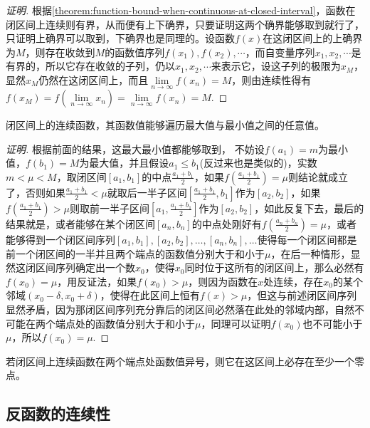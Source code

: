 \begin{proof}[证明]
  根据\autoref{theorem:function-bound-when-continuous-at-closed-interval}，函数在闭区间上连续则有界，从而便有上下确界，只要证明这两个确界能够取到就行了，只证明上确界可以取到，下确界也是同理的。设函数$f(x)$在这闭区间上的上确界为$M$，则存在收敛到$M$的函数值序列$f(x_1),f(x_2),\cdots$，而自变量序列$x_1,x_2,\cdots$是有界的，所以它存在收敛的子列，仍以$x_1,x_2,\cdots$来表示它，设这子列的极限为$x_M$，显然$x_M$仍然在这闭区间上，而且$\lim\limits_{n \to \infty}f(x_n)=M$，则由连续性得有$f(x_M)=f(\lim\limits_{n \to \infty} x_n) = \lim\limits_{n \to \infty} f(x_n) = M$.
\end{proof}

\begin{theorem}[介值定理]
  闭区间上的连续函数，其函数值能够遍历最大值与最小值之间的任意值。
\end{theorem}

\begin{proof}[证明]
  根据前面的结果，这最大最小值都能够取到， 不妨设$f(a_1)=m$为最小值，$f(b_1)=M$为最大值，并且假设$a_1 \leqslant b_1$(反过来也是类似的)，实数$m < \mu < M$，取闭区间$[a_1,b_1]$的中点$\frac{a_1+b_1}{2}$，如果$f(\frac{a_1+b_1}{2})=\mu$则结论就成立了，否则如果$\frac{a_1+b_1}{2} < \mu$就取后一半子区间$[\frac{a_1+b_1}{2}, b_1]$作为$[a_2,b_2]$，如果$f(\frac{a_1+b_1}{2})>\mu$则取前一半子区间$[a_1,\frac{a_1+b_1}{2}]$作为$[a_2,b_2]$，如此反复下去，最后的结果就是，或者能够在某个闭区间$[a_n,b_n]$的中点处刚好有$f(\frac{a_n+b_n}{2})=\mu$，或者能够得到一个闭区间序列$[a_1,b_1],[a_2,b_2],\ldots,[a_n,b_n],\ldots$使得每一个闭区间都是前一个闭区间的一半并且两个端点的函数值分别大于和小于$\mu$，在后一种情形，显然这闭区间序列确定出一个数$x_0$，使得$x_0$同时位于这所有的闭区间上，那么必然有$f(x_0)=\mu$，用反证法，如果$f(x_0)>\mu$，则因为函数在$x$处连续，存在$x_0$的某个邻域$(x_0-\delta,x_0+\delta)$，使得在此区间上恒有$f(x)>\mu$，但这与前述闭区间序列显然矛盾，因为那闭区间序列充分靠后的闭区间必然落在此处的邻域内部，自然不可能在两个端点处的函数值分别大于和小于$\mu$，同理可以证明$f(x_0)$也不可能小于$\mu$，所以$f(x_0)=\mu$.
\end{proof}

\begin{inference}[零点定理]
  若闭区间上连续函数在两个端点处函数值异号，则它在这区间上必存在至少一个零点。
\end{inference}

\subsection{反函数的连续性}
\label{sec:continuousness-of-reverse-function}

